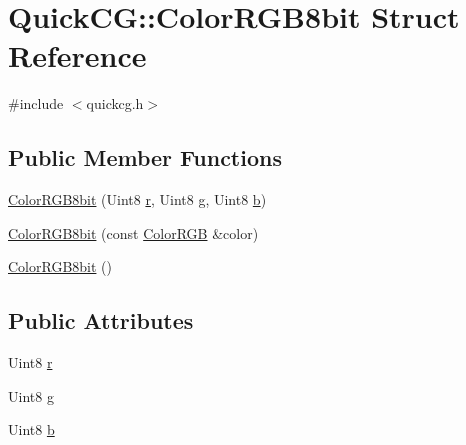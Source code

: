 \hypertarget{structQuickCG_1_1ColorRGB8bit}{\section{Quick\-C\-G\-:\-:Color\-R\-G\-B8bit Struct Reference}
\label{structQuickCG_1_1ColorRGB8bit}
}


{\ttfamily \#include $<$quickcg.\-h$>$}

\subsection*{Public Member Functions}
\begin{DoxyCompactItemize}
\item 
\hyperlink{structQuickCG_1_1ColorRGB8bit_a6aad15726fbe6fabf1b2ffa477bc3202}{Color\-R\-G\-B8bit} (Uint8 \hyperlink{structQuickCG_1_1ColorRGB8bit_adbcc046ebfa38ac05446b51f341363f9}{r}, Uint8 \hyperlink{structQuickCG_1_1ColorRGB8bit_a04249198bd045324503af50b82ddf923}{g}, Uint8 \hyperlink{structQuickCG_1_1ColorRGB8bit_a6f74056a1bc52437a5e9c4c0af4177b7}{b})
\item 
\hyperlink{structQuickCG_1_1ColorRGB8bit_a2ad9498e869fb61d884b482baf247087}{Color\-R\-G\-B8bit} (const \hyperlink{structQuickCG_1_1ColorRGB}{Color\-R\-G\-B} \&color)
\item 
\hyperlink{structQuickCG_1_1ColorRGB8bit_a53d8d2b7e6935909928c18a62554f087}{Color\-R\-G\-B8bit} ()
\end{DoxyCompactItemize}
\subsection*{Public Attributes}
\begin{DoxyCompactItemize}
\item 
Uint8 \hyperlink{structQuickCG_1_1ColorRGB8bit_adbcc046ebfa38ac05446b51f341363f9}{r}
\item 
Uint8 \hyperlink{structQuickCG_1_1ColorRGB8bit_a04249198bd045324503af50b82ddf923}{g}
\item 
Uint8 \hyperlink{structQuickCG_1_1ColorRGB8bit_a6f74056a1bc52437a5e9c4c0af4177b7}{b}
\end{DoxyCompactItemize}


